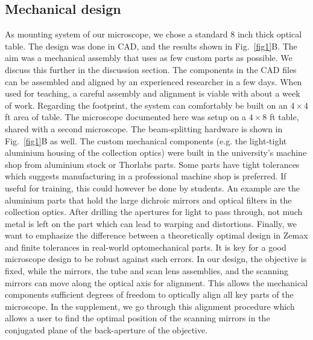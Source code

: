 \documentclass[10pt,letterpaper]{article}
\begin{document}
\subsection*{Mechanical design}
As mounting system of our microscope, we chose a standard 8 inch thick optical table. The design was done in CAD, and the results shown in Fig.~\ref{fig1}B. The aim was a mechanical assembly that uses as few custom parts as possible. We discuss this further in the discussion section. The components in the CAD files can be assembled and aligned by an experienced researcher in a few days. When used for teaching, a careful assembly and alignment is viable with about a week of work. Regarding the footprint, the system can comfortably be built on an $4\times4$ ft area of table. The microscope documented here was setup on a $4\times8$ ft table, shared with a second microscope. The beam-splitting hardware is shown in Fig.~\ref{fig1}B as well.\newline
The custom mechanical components (e.g. the light-tight aluminium housing of the collection optics) were built in the university's machine shop from aluminium stock or Thorlabs parts. Some parts have tight tolerances which suggests manufacturing in a professional machine shop is preferred. If useful for training, this could however be done by students. An example are the aluminium parts that hold the large dichroic mirrors and optical filters in the collection optics. After drilling the apertures for light to pass through, not much metal is left on the part which can lead to warping and distortions.\newline
Finally, we want to emphasize the difference between a theoretically optimal design in Zemax and finite tolerances in real-world optomechanical parts. It is key for a good microscope design to be robust against such errors. In our design, the objective is fixed, while the mirrors, the tube and scan lens assemblies, and the scanning mirrors can move along the optical axis for alignment. This allows the mechanical components sufficient degrees of freedom to optically align all key parts of the microscope. In the supplement, we go through this alignment procedure which allows a user to find the optimal position of the scanning mirrors in the conjugated plane of the back-aperture of the objective.
\end{document}
